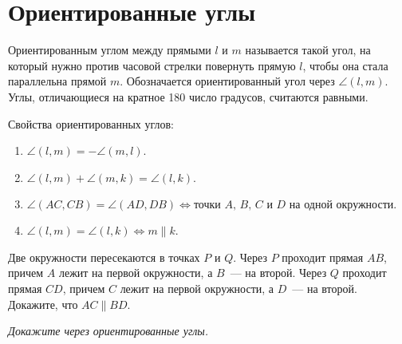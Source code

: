 
\section*{Ориентированные углы}




Ориентированным углом между прямыми $l$ и $m$ называется такой угол, на который
нужно против часовой стрелки повернуть прямую $l$, чтобы она стала параллельна
прямой $m$.
Обозначается ориентированный угол через $\angle(l, m)$.
Углы, отличающиеся на кратное 180 число градусов, считаются равными.

\begin{problems}

\itemx{$^\circ$}
Свойства ориентированных углов:
\begin{enumerate}
	\item $\angle (l, m) = - \angle (m, l)$.
	\item $\angle (l, m) + \angle (m, k) = \angle (l, k)$.
	\item \(
        \angle (AC, CB) = \angle (AD, DB)
    \Leftrightarrow
        \text{точки $A$, $B$, $C$ и $D$ на одной окружности.}
    \)
	\item $\angle (l,m) = \angle (l,k) \Leftrightarrow m \parallel k$.
\end{enumerate}

\itemx{$^\circ$}
Две окружности пересекаются в точках $P$ и $Q$.
Через $P$ проходит прямая $AB$, причем $A$ лежит на первой окружности,
а $B$~--- на второй.
Через $Q$ проходит прямая $CD$, причем $C$ лежит на первой окружности,
а $D$~--- на второй.
Докажите, что $AC \parallel BD$.

\end{problems}

\emph{Докажите через ориентированные углы.}

